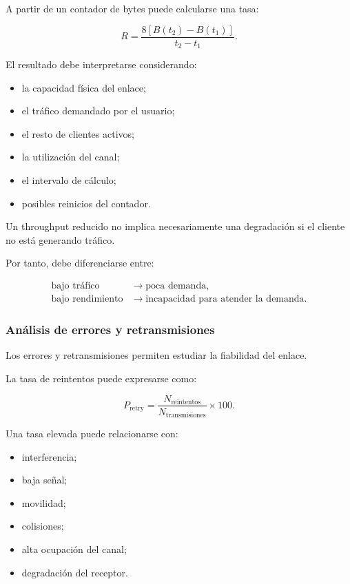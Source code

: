 A partir de un contador de bytes puede calcularse una tasa:

\[
    R
    =
    \frac{
        8
        \left[
            B(t_2)-B(t_1)
        \right]
    }{
        t_2-t_1
    }.
\]

El resultado debe interpretarse considerando:

\begin{itemize}
    \item la capacidad física del enlace;

    \item el tráfico demandado por el usuario;

    \item el resto de clientes activos;

    \item la utilización del canal;

    \item el intervalo de cálculo;

    \item posibles reinicios del contador.
\end{itemize}

Un throughput reducido no implica necesariamente una degradación si el
cliente no está generando tráfico.

Por tanto, debe diferenciarse entre:

\[
\begin{aligned}
    \text{bajo tráfico}
    &\longrightarrow
    \text{poca demanda},\\
    \text{bajo rendimiento}
    &\longrightarrow
    \text{incapacidad para atender la demanda}.
\end{aligned}
\]


\subsubsection*{Análisis de errores y retransmisiones}

Los errores y retransmisiones permiten estudiar la fiabilidad del enlace.

La tasa de reintentos puede expresarse como:

\[
    P_{\mathrm{retry}}
    =
    \frac{
        N_{\mathrm{reintentos}}
    }{
        N_{\mathrm{transmisiones}}
    }
    \times
    100.
\]

Una tasa elevada puede relacionarse con:

\begin{itemize}
    \item interferencia;

    \item baja señal;

    \item movilidad;

    \item colisiones;

    \item alta ocupación del canal;

    \item degradación del receptor.
\end{itemize}

